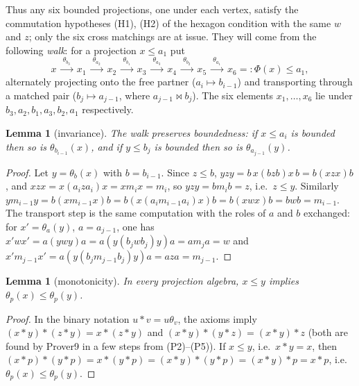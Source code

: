 \documentclass[11pt]{amsart}
\newtheorem{lemma}[theorem]{Lemma}
\theoremstyle{definition}
\begin{document}
Thus any six bounded projections, one under each vertex, satisfy the commutation hypotheses (H1), (H2) of the hexagon condition with the same $w$ and $z$; only the six cross matchings are at issue. They will come from the following \emph{walk}: for a projection $x\le a_1$ put
\[
x\ \xrightarrow{\ \theta_{b_3}\ }\ x_1\ \xrightarrow{\ \theta_{a_2}\ }\ x_2\ \xrightarrow{\ \theta_{b_1}\ }\ x_3\ \xrightarrow{\ \theta_{a_3}\ }\ x_4\ \xrightarrow{\ \theta_{b_2}\ }\ x_5\ \xrightarrow{\ \theta_{a_1}\ }\ x_6=:\Phi(x)\le a_1 ,
\]
alternately projecting onto the free partner ($a_i\mapsto b_{i-1}$) and transporting through a matched pair ($b_j\mapsto a_{j-1}$, where $a_{j-1}\bowtie b_j$). The six elements $x_1,\dots,x_6$ lie under $b_3,a_2,b_1,a_3,b_2,a_1$ respectively.

\begin{lemma}[invariance]\label{lem:inv}
The walk preserves boundedness: if $x\le a_i$ is bounded then so is $\theta_{b_{i-1}}(x)$, and if $y\le b_j$ is bounded then so is $\theta_{a_{j-1}}(y)$.
\end{lemma}
\begin{proof}
Let $y=\theta_b(x)$ with $b=b_{i-1}$. Since $z\le b$, $yzy=b\,x(bzb)x\,b=b(xzx)b$, and $xzx=x(a_iza_i)x=xm_ix=m_i$, so $yzy=bm_ib=z$, i.e.\ $z\le y$. Similarly $ym_{i-1}y=b(xm_{i-1}x)b=b(x(a_im_{i-1}a_i)x)b=b(xwx)b=bwb=m_{i-1}$. The transport step is the same computation with the roles of $a$ and $b$ exchanged: for $x'=\theta_a(y)$, $a=a_{j-1}$, one has $x'wx'=a(ywy)a=a(y(b_jwb_j)y)a=am_ja=w$ and $x'm_{j-1}x'=a(y(b_jm_{j-1}b_j)y)a=aza=m_{j-1}$.
\end{proof}

\begin{lemma}[monotonicity]\label{lem:mono}
In every projection algebra, $x\le y$ implies $\theta_p(x)\le\theta_p(y)$.
\end{lemma}
\begin{proof}
In the binary notation $u*v=u\theta_v$, the axioms imply $(x*y)*(z*y)=x*(z*y)$ and $(x*y)*(y*z)=(x*y)*z$ (both are found by Prover9 in a few steps from (P2)--(P5)). If $x\le y$, i.e.\ $x*y=x$, then $(x*p)*(y*p)=x*(y*p)=(x*y)*(y*p)=(x*y)*p=x*p$, i.e.\ $\theta_p(x)\le\theta_p(y)$.
\end{proof}
\end{document}
